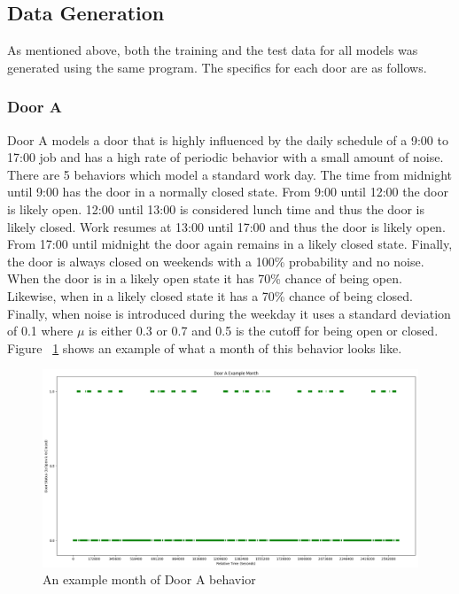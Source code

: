   \subsection{ Data Generation }

  As mentioned above, both the training and the test data for all models was
  generated using the same program. The specifics for each door are as follows.

  \subsubsection{ Door A }

  Door A models a door that is highly influenced by the daily schedule of a
  9:00 to 17:00 job and has a high rate of periodic behavior with a small
  amount of noise. There are 5 behaviors which model a standard work day. The
  time from midnight until 9:00 has the door in a normally closed
  state. From 9:00 until 12:00 the door is likely open. 12:00 until 13:00 is
  considered lunch time and thus the door is likely closed. Work resumes at
  13:00 until 17:00 and thus the door is likely open. From 17:00 until midnight
  the door again remains in a likely closed state. Finally, the door is always
  closed on weekends with a 100\% probability and no noise. \\

  When the door is in a likely open state it has 70\% chance of being open.
  Likewise, when in a likely closed state it has a 70\% chance of being closed.
  Finally, when noise is introduced during the weekday it uses a standard deviation
  of 0.1 where $\mu$ is either 0.3 or 0.7 and 0.5 is the cutoff for being open or
  closed. Figure ~\ref{figure:Door_A_example} shows an example of what a
  month of this behavior looks like.\\

  \begin{figure}[!htb]
    \centering
    \includegraphics[width=\linewidth]{images/Door_A_Example_Month.png}
    \caption{An example month of Door A behavior}
    \label{figure:Door_A_example}
  \end{figure}

